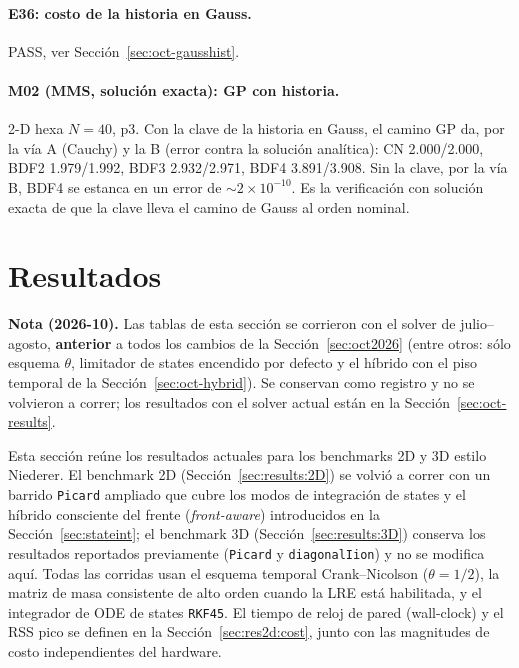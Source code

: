 \documentclass[11pt,a4paper]{article}
\newcommand{\code}[1]{\texttt{\small #1}}
\begin{document}
\paragraph{E36: costo de la historia en Gauss.} PASS, ver
Sección~\ref{sec:oct-gausshist}.

\paragraph{M02 (MMS, solución exacta): GP con historia.} 2-D hexa $N=40$, p3.
Con la clave de la historia en Gauss, el camino GP da, por la vía A (Cauchy) y la B
(error contra la solución analítica): CN 2.000/2.000, BDF2 1.979/1.992, BDF3
2.932/2.971, BDF4 3.891/3.908. Sin la clave, por la vía B, BDF4 se estanca en un
error de $\sim2\times10^{-10}$. Es la verificación con solución exacta de que la
clave lleva el camino de Gauss al orden nominal.

\section{Resultados}
\label{sec:results}

\textbf{Nota (2026-10).} Las tablas de esta sección se corrieron con el solver de
julio--agosto, \textbf{anterior} a todos los cambios de la
Sección~\ref{sec:oct2026} (entre otros: sólo esquema $\theta$, limitador de states
encendido por defecto y el híbrido con el piso temporal de la
Sección~\ref{sec:oct-hybrid}). Se conservan como registro y no se volvieron a
correr; los resultados con el solver actual están en la
Sección~\ref{sec:oct-results}.

Esta sección reúne los resultados actuales para los benchmarks 2D y 3D
estilo Niederer. El benchmark 2D (Sección~\ref{sec:results:2D}) se volvió a correr
con un barrido \code{Picard} ampliado que cubre los modos de integración de states y
el híbrido consciente del frente (\emph{front-aware}) introducidos en la
Sección~\ref{sec:stateint}; el benchmark 3D (Sección~\ref{sec:results:3D}) conserva
los resultados reportados previamente (\code{Picard} y \code{diagonalIion}) y no se
modifica aquí. Todas las corridas usan el esquema temporal Crank--Nicolson
($\theta = 1/2$), la matriz de masa consistente de alto orden cuando la LRE está
habilitada, y el integrador de ODE de states \code{RKF45}. El tiempo de reloj de
pared (wall-clock) y el RSS pico se definen en la Sección~\ref{sec:res2d:cost}, junto
con las magnitudes de costo independientes del hardware.
\end{document}
